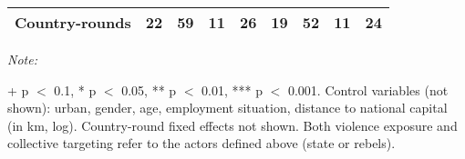 \begin{table}[!h]
{\begin{threeparttable}
\begin{tabular}[t]{lcccccccc}
Country-rounds & 22 & 59 & 11 & 26 & 19 & 52 & 11 & 24\\
\bottomrule
\end{tabular}
\begin{tablenotes}[para]
\item \textit{Note: } 
\item + p $<$ 0.1, * p $<$ 0.05, ** p $<$ 0.01, *** p $<$ 0.001. Control variables (not shown): urban, gender, age, employment situation, distance to national capital (in km, log). Country-round fixed effects not shown. Both violence exposure and collective targeting refer to the actors defined above (state or rebels).
\end{tablenotes}
\end{threeparttable}}
\end{table}
